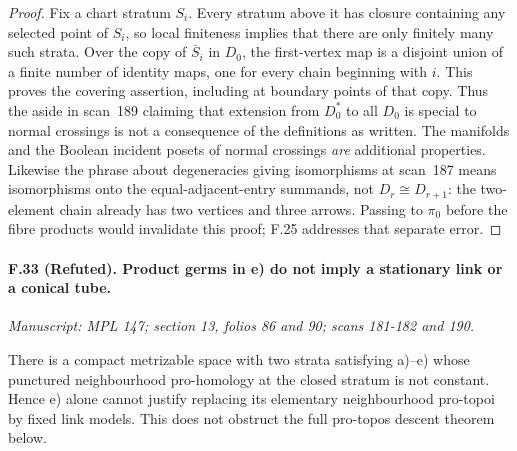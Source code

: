 \begin{proof}
Fix a chart stratum $S_i$. Every stratum above it has closure containing
any selected point of $S_i$, so local finiteness implies that there are
only finitely many such strata. Over the copy of $\overline S_i$ in
$D_0$, the first-vertex map is a disjoint union of a finite number of
identity maps, one for every chain beginning with $i$. This proves the
covering assertion, including at boundary points of that copy. Thus the
aside in scan~189 claiming that extension from $D_0^*$ to all $D_0$ is
special to normal crossings is not a consequence of the definitions
as written. The manifolds and the Boolean incident posets of normal
crossings \emph{are} additional properties. Likewise the phrase about
degeneracies giving isomorphisms at scan~187 means isomorphisms onto the
equal-adjacent-entry summands, not $D_r\cong D_{r+1}$: the two-element
chain already has two vertices and three arrows. Passing to $\pi_0$
before the fibre products would invalidate this proof; F.25 addresses
that separate error.
\end{proof}

\paragraph{F.33 (Refuted). Product germs in e) do not imply a stationary
link or a conical tube.}
\textit{Manuscript: MPL 147; section 13, folios 86 and 90; scans 181-182 and 190.}

There is a compact metrizable space with two strata satisfying a)--e)
whose punctured neighbourhood pro-homology at the closed stratum is not
constant. Hence e) alone cannot justify replacing its elementary
neighbourhood pro-topoi by fixed link models. This does not obstruct
the full pro-topos descent theorem below.

